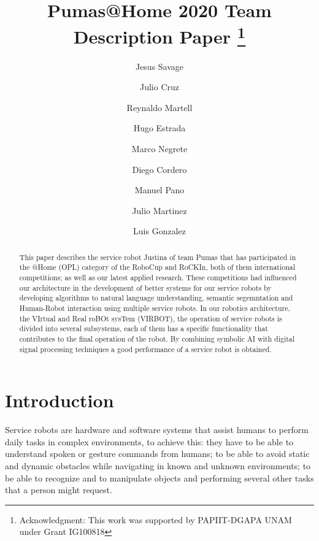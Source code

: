 \documentclass{llncs}
\begin{document}
\title{Pumas@Home 2020 Team Description Paper
\thanks{Acknowledgment: This work was supported by PAPIIT-DGAPA UNAM under Grant IG100818}}
\author{
	Jesus Savage 
	\and Julio Cruz 
	\and Reynaldo Martell 
	\and Hugo Estrada 
	\and Marco Negrete 
	\and Diego Cordero
	\and Manuel Pano
	\and Julio Martinez
	\and Luis Gonzalez
}
\maketitle


\begin{abstract}

This paper describes the service robot Justina of team Pumas that has participated in the @Home (OPL) category of the RoboCup and RoCKIn, both of them international competitions; as well as our latest applied research. These competitions had influenced our architecture in the development of better systems for our service robots by developing algorithms to natural language understanding, semantic segemntation and Human-Robot interaction using multiple service robots.
In our robotics architecture, the VIrtual and Real roBOt sysTem (VIRBOT), the operation of service robots is divided into several subsystems, each of them has a specific functionality  that contributes to the final operation of the robot.
By combining symbolic AI with digital signal processing techniques a good performance of a service robot is obtained.

\end{abstract}


\section{Introduction}

Service robots are hardware and software systems that assist humans to perform daily tasks in complex environments, to achieve this: they have to be able to understand spoken or gesture commands from humans; to be able to avoid static and dynamic obstacles while navigating in known and unknown environments; to be able to recognize and to manipulate objects and performing several other tasks that a person might request. 
\end{document}
